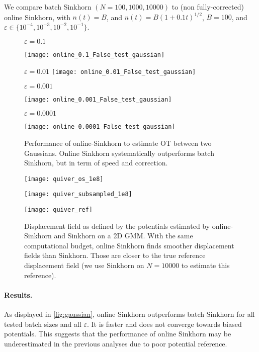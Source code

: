 We compare batch Sinkhorn $(N=100, 1000, 10000)$ to (non fully-corrected) online
Sinkhorn, with $n(t) = B$, and $n(t) = B (1 + 0.1 t)^{1/2}$, $B=100$, and
$\varepsilon \in \{ 10^{-4}, 10^{-3}, 10^{-2}, 10^{-1}\}$.

\begin{figure}[t]
        \centering
        $\varepsilon = 0.1$
    
        \texttt{[image: online\_0.1\_False\_test\_gaussian]}
        
        $\varepsilon = 0.01$
        \texttt{[image: online\_0.01\_False\_test\_gaussian]}
    
        $\varepsilon = 0.001$
    
        \texttt{[image: online\_0.001\_False\_test\_gaussian]}
    
        $\varepsilon = 0.0001$
    
        \texttt{[image: online\_0.0001\_False\_test\_gaussian]}
    \caption{Performance of online-Sinkhorn to estimate OT between two Gaussians. Online Sinkhorn systematically outperforms batch Sinkhorn, but in term of speed and correction.}
    \label{fig:gaussian}
\end{figure}

\begin{figure}[htbp]
    \centering
    
    \texttt{[image: quiver\_os\_1e8]}

    \texttt{[image: quiver\_subsampled\_1e8]}

    \texttt{[image: quiver\_ref]}
    
    \caption{Displacement field as defined by the potentials estimated by online-Sinkhorn and Sinkhorn on a 2D GMM. With the same computational budget, online Sinkhorn finds smoother displacement fields than Sinkhorn. Those are closer to the true reference displacement field (we use Sinkhorn on $N=10000$ to estimate this reference).}
    \label{fig:potentials_2d}
\end{figure}

\paragraph{Results.} As displayed in \autoref{fig:gaussian},
online Sinkhorn outperforms batch Sinkhorn for all tested batch sizes and all $\varepsilon$. It is faster and does not converge towards biased potentials. This suggests that the performance of online Sinkhorn may be underestimated in the previous analyses due to poor potential reference.


